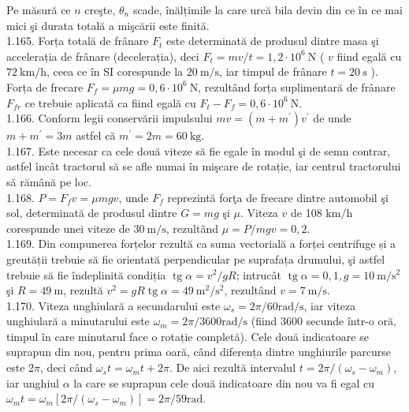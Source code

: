\documentclass[10pt]{article}
\begin{document}
Pe măsură ce $n$ creşte, $\theta_{n}$ scade, înălțimile la care urcă bila devin din ce în ce mai mici şi durata totală a mişcării este finită.\\
1.165. Forța totală de frânare $F_{t}$ este determinată de produsul dintre masa şi accelerația de frânare (decelerația), deci $F_{t}=m v / t=1,2 \cdot 10^{6} \mathrm{~N}$ ( $v$ fiind egală cu $72 \mathrm{~km} / \mathrm{h}$, ceea ce în SI corespunde la $20 \mathrm{~m} / \mathrm{s}$, iar timpul de frânare $t=20 \mathrm{~s}$ ). Forța de frecare $F_{f}=\mu m g=0,6 \cdot 10^{6} \mathrm{~N}$, rezultând forța suplimentară de frânare $F_{f r}$ ce trebuie aplicată ca fiind egală cu $F_{t}-F_{f}=0,6 \cdot 10^{6} \mathrm{~N}$.\\
1.166. Conform legii conservării impulsului $m v=\left(m+m^{\prime}\right) v^{\prime}$ de unde $m+m^{\prime}=3 m$ astfel că $m^{\prime}=2 m=60 \mathrm{~kg}$.\\
1.167. Este necesar ca cele două viteze să fie egale în modul şi de semn contrar, astfel încât tractorul să se afle numai în mişcare de rotație, iar centrul tractorului să rămână pe loc.\\
1.168. $P=F_{f} v=\mu m g v$, unde $F_{f}$ reprezintă forţa de frecare dintre automobil şi sol, determinată de produsul dintre $G=m g$ şi $\mu$. Viteza $v$ de 108 $\mathrm{km} / \mathrm{h}$ corespunde unei viteze de $30 \mathrm{~m} / \mathrm{s}$, rezultând $\mu=P / m g v=0,2$.\\
1.169. Din compunerea forțelor rezultă ca suma vectorială a forței centrifuge și a greutății trebuie să fie orientată perpendicular pe suprafața drumului, şi astfel trebuie să fie îndeplinită condiția $\operatorname{tg} \alpha=v^{2} / g R$; intrucât $\operatorname{tg} \alpha=0,1, g=10 \mathrm{~m} / \mathrm{s}^{2}$ şi $R=49 \mathrm{~m}$, rezultă $v^{2}=g R \operatorname{tg} \alpha=49 \mathrm{~m}^{2} / \mathrm{s}^{2}$, rezultând $v=7 \mathrm{~m} / \mathrm{s}$.\\
1.170. Viteza unghiulară a secundarului este $\omega_{s}=2 \pi / 60 \mathrm{rad} / \mathrm{s}$, iar viteza unghiulară a minutarului este $\omega_{m}=2 \pi / 3600 \mathrm{rad} / \mathrm{s}$ (fiind 3600 secunde într-o oră, timpul în care minutarul face o rotație completă). Cele două indicatoare se suprapun din nou, pentru prima oară, când diferența dintre unghiurile parcurse este $2 \pi$, deci când $\omega_{s} t=\omega_{m} t+2 \pi$. De aici rezultă intervalul $t=2 \pi /\left(\omega_{s}-\omega_{m}\right)$, iar unghiul $\alpha$ la care se suprapun cele două indicatoare din nou va fi egal cu $\omega_{m} t=\omega_{m}\left[2 \pi /\left(\omega_{s}-\omega_{m}\right)\right]=2 \pi / 59 \mathrm{rad}$.\\
\end{document}
